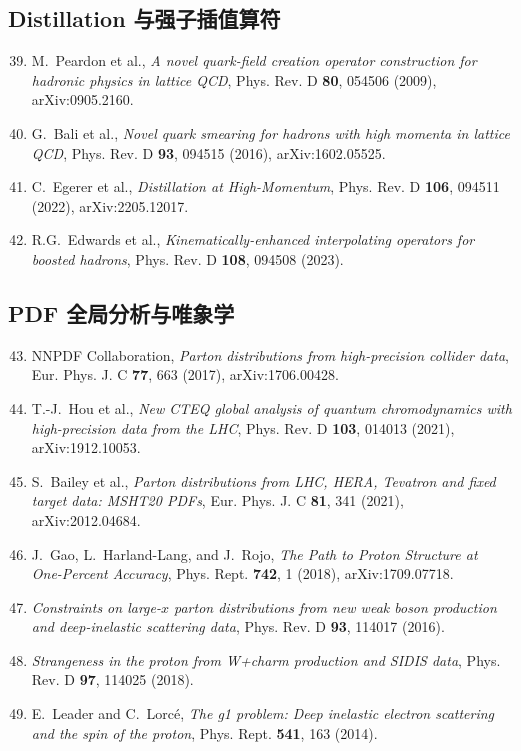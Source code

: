 \documentclass[11pt,a4paper]{ctexart}
\begin{document}
\subsection*{Distillation 与强子插值算符}
\begin{enumerate}\setcounter{enumi}{38}
  \item M.~Peardon et al., \textit{A novel quark-field creation operator construction for hadronic physics in lattice QCD}, Phys. Rev. D \textbf{80}, 054506 (2009), arXiv:0905.2160.
  \item G.~Bali et al., \textit{Novel quark smearing for hadrons with high momenta in lattice QCD}, Phys. Rev. D \textbf{93}, 094515 (2016), arXiv:1602.05525.
  \item C.~Egerer et al., \textit{Distillation at High-Momentum}, Phys. Rev. D \textbf{106}, 094511 (2022), arXiv:2205.12017.
  \item R.G.~Edwards et al., \textit{Kinematically-enhanced interpolating operators for boosted hadrons}, Phys. Rev. D \textbf{108}, 094508 (2023).
\end{enumerate}

\subsection*{PDF 全局分析与唯象学}
\begin{enumerate}\setcounter{enumi}{42}
  \item NNPDF Collaboration, \textit{Parton distributions from high-precision collider data}, Eur. Phys. J. C \textbf{77}, 663 (2017), arXiv:1706.00428.
  \item T.-J.~Hou et al., \textit{New CTEQ global analysis of quantum chromodynamics with high-precision data from the LHC}, Phys. Rev. D \textbf{103}, 014013 (2021), arXiv:1912.10053.
  \item S.~Bailey et al., \textit{Parton distributions from LHC, HERA, Tevatron and fixed target data: MSHT20 PDFs}, Eur. Phys. J. C \textbf{81}, 341 (2021), arXiv:2012.04684.
  \item J.~Gao, L.~Harland-Lang, and J.~Rojo, \textit{The Path to Proton Structure at One-Percent Accuracy}, Phys. Rept. \textbf{742}, 1 (2018), arXiv:1709.07718.
  \item \textit{Constraints on large-$x$ parton distributions from new weak boson production and deep-inelastic scattering data}, Phys. Rev. D \textbf{93}, 114017 (2016).
  \item \textit{Strangeness in the proton from W+charm production and SIDIS data}, Phys. Rev. D \textbf{97}, 114025 (2018).
  \item E.~Leader and C.~Lorc\'e, \textit{The g1 problem: Deep inelastic electron scattering and the spin of the proton}, Phys. Rept. \textbf{541}, 163 (2014).
\end{enumerate}
\end{document}
